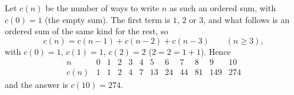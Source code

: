 Let $c(n)$ be the number of ways to write $n$ as such an ordered sum, with $c(0)=1$ (the empty sum). The first term is $1$, $2$ or $3$, and what follows is an ordered sum of the same kind for the rest, so
\[c(n)=c(n-1)+c(n-2)+c(n-3)\qquad(n\ge3),\]
with $c(0)=1$, $c(1)=1$, $c(2)=2$ ($2=2=1+1$). Hence
\[\begin{array}{c|ccccccccccc}
n&0&1&2&3&4&5&6&7&8&9&10\\\hline
c(n)&1&1&2&4&7&13&24&44&81&149&274
\end{array}\]
and the answer is $c(10)=\boxed{274}$.
